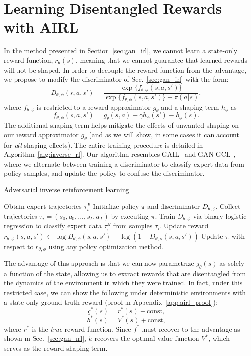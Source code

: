 \documentclass{article} \usepackage{iclr2018_conference,times}
\begin{document}
\section{Learning Disentangled Rewards with AIRL}
In the method presented in Section~\ref{sec:gan_irl}, we cannot learn a state-only reward function, $r_\theta(s)$, meaning that we cannot guarantee that learned rewards will not be shaped. In order to decouple the reward function from the advantage, we propose to modify the discriminator of Sec.~\ref{sec:gan_irl} with the form:
\[
D_{\theta, \phi}(s,a,s') = \frac{\exp\{f_{\theta, \phi}(s,a,s')\}}{\exp\{f_{\theta, \phi}(s,a,s')\} + \pi(a|s)} ,
\]
where $f_{\theta, \phi}$ is restricted to a reward approximator $g_\theta$ and a shaping term $h_\phi$ as
\begin{equation}
\label{eqn:inverse_ql}
f_{\theta, \phi}(s,a,s') = g_\theta(s,a) + \gamma h_\phi(s') - h_\phi(s) .
\end{equation}
The additional shaping term helps mitigate the effects of unwanted shaping on our reward approximator $g_\theta$ (and as we will show, in some cases it can account for \textit{all} shaping effects). The entire training procedure is detailed in Algorithm~\ref{alg:inverse_rl}. Our algorithm resembles GAIL~\citep{Ho16b} and GAN-GCL~\citep{Finn16b}, where we alternate between training a discriminator to classify expert data from policy samples, and update the policy to confuse the discriminator.

\begin{algorithm*}[tb]
\caption{Adversarial inverse reinforcement learning}
\label{alg:inverse_rl}
\begin{algorithmic}[1]
    \STATE Obtain expert trajectories $\tau^E_i$
    \STATE Initialize policy $\pi$ and discriminator $D_{\theta, \phi}$.
        \STATE Collect trajectories $\tau_i = (s_0, a_0, ..., s_T, a_T)$ by executing $\pi$.
        \STATE Train $D_{\theta, \phi}$ via binary logistic regression to classify expert data $\tau^E_i$ from samples $\tau_i$.
        \STATE Update reward $r_{\theta, \phi}(s,a,s') \leftarrow \log D_{\theta, \phi}(s,a,s') - \log(1-D_{\theta, \phi}(s,a,s'))$
        \STATE Update $\pi$ with respect to $r_{\theta, \phi}$ using any policy optimization method.
    \ENDFOR
\end{algorithmic}
\end{algorithm*}


The advantage of this approach is that we can now parametrize $g_\theta(s)$ as solely a function of the state, allowing us to extract rewards that are disentangled from the dynamics of the environment in which they were trained. In fact, under this restricted case, we can show the following under deterministic environments with a state-only ground truth reward (proof in Appendix~\ref{app:airl_proof}):
\[g^*(s) = r^*(s) + \text{const},\]
\[h^*(s) = V^*(s) + \text{const},\]
where $r^*$ is the \textit{true} reward function. Since $f^*$ must recover to the advantage as shown in Sec.~\ref{sec:gan_irl}, $h$ recovers the optimal value function $V^*$, which serves as the reward shaping term.
\end{document}
